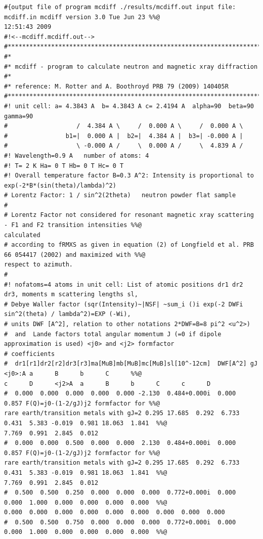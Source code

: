 {\footnotesize
\begin{verbatim}
#{output file of program mcdiff ./results/mcdiff.out input file: mcdiff.in mcdiff version 3.0 Tue Jun 23 %%@
12:51:43 2009
#!<--mcdiff.mcdiff.out-->
#***********************************************************************
#*
#* mcdiff - program to calculate neutron and magnetic xray diffraction
#*
#* reference: M. Rotter and A. Boothroyd PRB 79 (2009) 140405R
#***********************************************************************
#! unit cell: a= 4.3843 A  b= 4.3843 A c= 2.4194 A  alpha=90  beta=90 gamma=90
#                   /  4.384 A \     /  0.000 A \     /  0.000 A \ 
#                b1=|  0.000 A |  b2=|  4.384 A |  b3=| -0.000 A |
#                   \ -0.000 A /     \  0.000 A /     \  4.839 A /
#! Wavelength=0.9 A   number of atoms: 4
#! T= 2 K Ha= 0 T Hb= 0 T Hc= 0 T
#! Overall temperature factor B=0.3 A^2: Intensity is proportional to exp(-2*B*(sin(theta)/lambda)^2)
# Lorentz Factor: 1 / sin^2(2theta)   neutron powder flat sample
#
# Lorentz Factor not considered for resonant magnetic xray scattering - F1 and F2 transition intensities %%@
calculated
# according to fRMXS as given in equation (2) of Longfield et al. PRB 66 054417 (2002) and maximized with %%@
respect to azimuth.
#
#! nofatoms=4 atoms in unit cell: List of atomic positions dr1 dr2 dr3, moments m scattering lengths sl,
# Debye Waller factor (sqr(Intensity)~|NSF| ~sum_i ()i exp(-2 DWFi sin^2(theta) / lambda^2)=EXP (-Wi),
# units DWF [A^2], relation to other notations 2*DWF=B=8 pi^2 <u^2>)
#  and  Lande factors total angular momentum J (=0 if dipole approximation is used) <j0> and <j2> formfactor
# coefficients
#  dr1[r1]dr2[r2]dr3[r3]ma[MuB]mb[MuB]mc[MuB]sl[10^-12cm]  DWF[A^2] gJ     <j0>:A a      B      b      C      %%@
c      D      <j2>A  a      B      b      C      c      D
#  0.000  0.000  0.000  0.000  0.000 -2.130  0.484+0.000i  0.000  0.857 F(Q)=j0-(1-2/gJ)j2 formfactor for %%@
rare earth/transition metals with gJ=2 0.295 17.685  0.292  6.733  0.431  5.383 -0.019  0.981 18.063  1.841  %%@
7.769  0.991  2.845  0.012 
#  0.000  0.000  0.500  0.000  0.000  2.130  0.484+0.000i  0.000  0.857 F(Q)=j0-(1-2/gJ)j2 formfactor for %%@
rare earth/transition metals with gJ=2 0.295 17.685  0.292  6.733  0.431  5.383 -0.019  0.981 18.063  1.841  %%@
7.769  0.991  2.845  0.012 
#  0.500  0.500  0.250  0.000  0.000  0.000  0.772+0.000i  0.000  0.000  1.000  0.000  0.000  0.000  0.000  %%@
0.000  0.000  0.000  0.000  0.000  0.000  0.000  0.000  0.000 
#  0.500  0.500  0.750  0.000  0.000  0.000  0.772+0.000i  0.000  0.000  1.000  0.000  0.000  0.000  0.000  %%@

\end{verbatim}}

